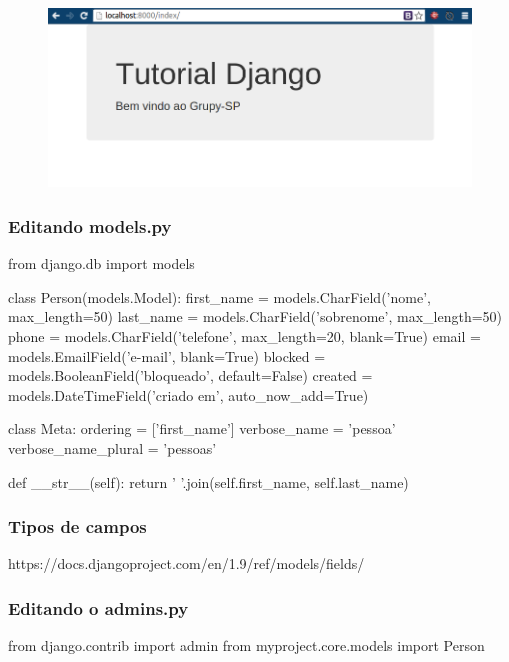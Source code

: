 \documentclass[aspectratio=169]{beamer}
\begin{document}
{\begin{frame}
    \begin{figure}[h]
      \centering
        \includegraphics[width=.8\paperwidth]{img/index.png}
    \end{figure}

\end{frame}


\begin{frame}[fragile]\frametitle{Editando models.py}

\begin{pythoncode}
from django.db import models

class Person(models.Model):
    first_name = models.CharField('nome', max_length=50)
    last_name = models.CharField('sobrenome', max_length=50)
    phone = models.CharField('telefone', max_length=20, blank=True)
    email = models.EmailField('e-mail', blank=True)
    blocked = models.BooleanField('bloqueado', default=False)
    created = models.DateTimeField('criado em', auto_now_add=True)

    class Meta:
        ordering = ['first_name']
        verbose_name = 'pessoa'
        verbose_name_plural = 'pessoas'

    def __str__(self):
        return ' '.join(self.first_name, self.last_name)
\end{pythoncode}

\end{frame}

\begin{frame}\frametitle{Tipos de campos}
  \begin{center}
    \Large https://docs.djangoproject.com/en/1.9/ref/models/fields/
  \end{center}
\end{frame}

\begin{frame}[fragile]\frametitle{Editando o admins.py}

\begin{pythoncode}
from django.contrib import admin
from myproject.core.models import Person


\end{pythoncode}
\end{frame}}
\end{document}
